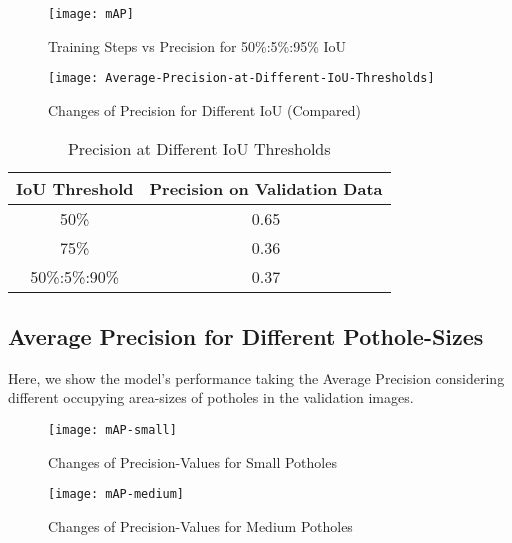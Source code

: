            \begin{figure}
                \centering
                \texttt{[image: mAP]}
                \caption{Training Steps vs Precision for 50\%:5\%:95\% IoU}
                \label{fig:precision_ioucoco}
            \end{figure}
            
            \begin{figure}
                \centering
                \texttt{[image: Average-Precision-at-Different-IoU-Thresholds]}
                \caption{Changes of Precision for Different IoU (Compared)}
                \label{fig:precision_iou}
            \end{figure}
            
            \begin{table}
                \centering
                \begin{tabular}{|c||c|} \hline 
                     IoU Threshold  &  Precision on Validation Data \\\hline\hline
                     50\%  &  0.65 \\\hline
                     75\%  &  0.36 \\\hline
                     50\%:5\%:90\%  &  0.37 \\\hline
                \end{tabular}
                \caption{Precision at Different IoU Thresholds}
                \label{tab:precision_iou}
            \end{table}
            
        \clearpage
        \subsection{Average Precision for Different Pothole-Sizes}
            Here, we show the model's performance taking the Average Precision considering different occupying area-sizes of potholes in the validation images.
            
            \begin{figure}[h]
                \centering
                \texttt{[image: mAP-small]}
                \caption{Changes of Precision-Values for Small Potholes}
                \label{fig:precision_sizes_small}
            \end{figure}
            
            \begin{figure}[h]
                \centering
                \texttt{[image: mAP-medium]}
                \caption{Changes of Precision-Values for Medium Potholes}
                \label{fig:precision_sizes_medium}
            \end{figure}
            
